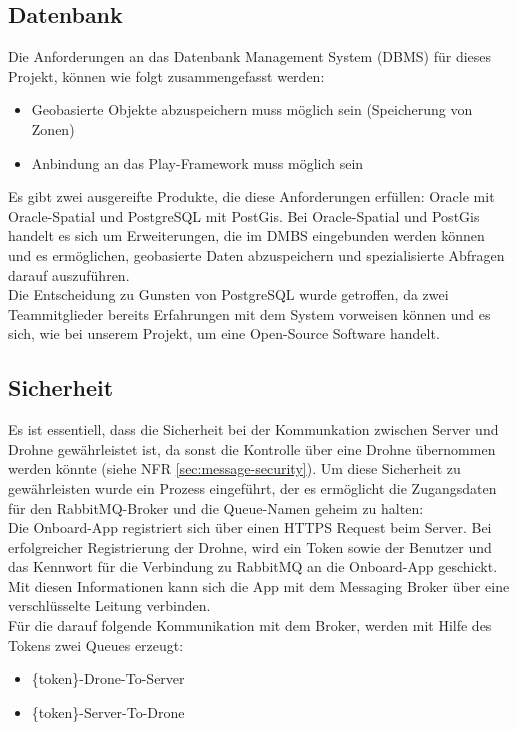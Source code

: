\subsection{Datenbank}

Die Anforderungen an das Datenbank Management System (\Gls{DBMS}) für dieses Projekt, können wie folgt zusammengefasst werden:

\begin{itemize}
	\item Geobasierte Objekte abzuspeichern muss möglich sein (Speicherung von Zonen)
	\item Anbindung an das Play-Framework muss möglich sein
\end{itemize}

Es gibt zwei ausgereifte Produkte, die diese Anforderungen erfüllen: Oracle mit Oracle-Spatial und PostgreSQL mit PostGis. Bei Oracle-Spatial und PostGis handelt es sich um Erweiterungen, die im DMBS eingebunden werden können und es ermöglichen, geobasierte Daten abzuspeichern und spezialisierte Abfragen darauf auszuführen. \\

Die Entscheidung zu Gunsten von PostgreSQL wurde getroffen, da zwei Teammitglieder bereits Erfahrungen mit dem System vorweisen können und es sich, wie bei unserem Projekt, um eine Open-Source Software handelt.

\subsection{Sicherheit}
Es ist essentiell, dass die Sicherheit bei der Kommunkation zwischen Server und Drohne gewährleistet ist, da sonst die Kontrolle über eine Drohne übernommen werden könnte (siehe NFR \ref{sec:message-security}). Um diese Sicherheit zu gewährleisten wurde ein Prozess eingeführt, der es ermöglicht die Zugangsdaten für den RabbitMQ-Broker und die Queue-Namen geheim zu halten: \\

Die Onboard-App registriert sich über einen HTTPS Request beim Server. Bei erfolgreicher Registrierung der Drohne, wird ein Token sowie der Benutzer und das Kennwort für die Verbindung zu RabbitMQ an die Onboard-App geschickt. Mit diesen Informationen kann sich die App mit dem Messaging Broker über eine verschlüsselte Leitung verbinden.\\

Für die darauf folgende Kommunikation mit dem Broker, werden mit Hilfe des Tokens zwei Queues erzeugt: 
\begin{itemize}
	\item \{token\}-Drone-To-Server
	\item  \{token\}-Server-To-Drone
\end{itemize}

